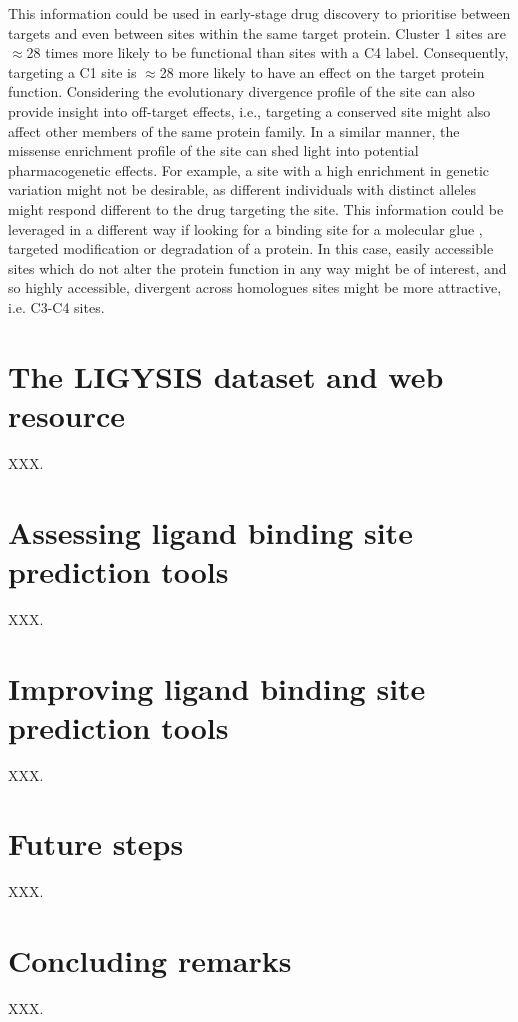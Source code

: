 This information could be used in early-stage drug discovery to prioritise between targets and even between sites within the same target protein. Cluster 1 sites are $\approx$28 times more likely to be functional than sites with a C4 label. Consequently, targeting a C1 site is $\approx$28 more likely to have an effect on the target protein function. Considering the evolutionary divergence profile of the site can also provide insight into off-target effects, i.e., targeting a conserved site might also affect other members of the same protein family. In a similar manner, the missense enrichment profile of the site can shed light into potential pharmacogenetic effects. For example, a site with a high enrichment in genetic variation might not be desirable, as different individuals with distinct alleles might respond different to the drug targeting the site. This information could be leveraged in a different way if looking for a binding site for a molecular glue \cite{SCHREIBER_2021_GLUES}, targeted modification \cite{BREWER_2024_ATLAS, BREWER_2024_SMAD3, ZHAO_2024_TFEB} or degradation \cite{ZENGERLE_2015_BRD4, GADD_2017_PROTAC} of a protein. In this case, easily accessible sites which do not alter the protein function in any way might be of interest, and so highly accessible, divergent across homologues sites might be more attractive, i.e. C3-C4 sites.

\section{The LIGYSIS dataset and web resource}

XXX.

\section{Assessing ligand binding site prediction tools}

XXX.

\section{Improving ligand binding site prediction tools}

XXX.

\section{Future steps}

XXX.

\section{Concluding remarks}

XXX.